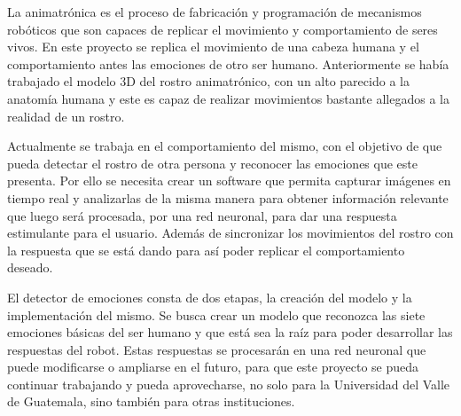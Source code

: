 La animatrónica es el proceso de fabricación y programación de mecanismos robóticos que son capaces de replicar el movimiento y comportamiento de seres vivos. En este proyecto se replica el movimiento de una cabeza humana y el comportamiento antes las emociones de otro ser humano. Anteriormente se había trabajado el modelo 3D del rostro animatrónico, con un alto parecido a la anatomía humana y este es capaz de realizar movimientos bastante allegados a la realidad de un rostro. 

Actualmente se trabaja en el comportamiento del mismo, con el objetivo de que pueda detectar el rostro de otra persona y reconocer las emociones que este presenta. Por ello se necesita crear un software que permita capturar imágenes en tiempo real y analizarlas de la misma manera para obtener información relevante que luego será procesada, por una red neuronal, para dar una respuesta estimulante para el usuario. Además de sincronizar los movimientos del rostro con la respuesta que se está dando para así poder replicar el comportamiento deseado.

El detector de emociones consta de dos etapas, la creación del modelo y la implementación del mismo. Se busca crear un modelo que reconozca las siete emociones básicas del ser humano y que está sea la raíz para poder desarrollar las respuestas del robot. Estas respuestas se procesarán en una red neuronal que puede modificarse o ampliarse en el futuro, para que este proyecto se pueda continuar trabajando y pueda aprovecharse, no solo para la Universidad del Valle de Guatemala, sino también para otras instituciones.